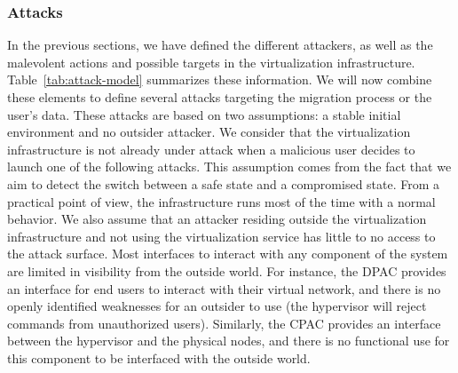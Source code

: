 \subsubsection{Attacks}
\label{sec:model-attacks}
In the previous sections, we have defined the different attackers, as well as the malevolent actions and possible targets in the virtualization infrastructure. 
Table~\ref{tab:attack-model} summarizes these information.
We will now combine these elements to define several attacks targeting the migration process or the user's data.
These attacks are based on two assumptions: a stable initial environment and no outsider attacker.
We consider that the virtualization infrastructure is not already under attack when a malicious user decides to launch one of the following attacks.
This assumption comes from the fact that we aim to detect the switch between a safe state and a compromised state. From a practical point of view, the infrastructure runs most of the time with a normal behavior.
We also assume that an attacker residing outside the virtualization infrastructure and not using the virtualization service has little to no access to the attack surface.
Most interfaces to interact with any component of the system are limited in visibility from the outside world.
For instance, the DPAC provides an interface for end users to interact with their virtual network, and there is no openly identified weaknesses for an outsider to use (\ie the hypervisor will reject commands from unauthorized users).
Similarly, the CPAC provides an interface between the hypervisor and the physical nodes, and there is no functional use for this component to be interfaced with the outside world.

